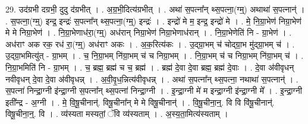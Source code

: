 \documentclass[17pt]{extarticle}
\begin{document}
29. उद॑ग्रभी दग्रभी॒ दुदु द॑ग्रभीत् । . अ॒ग्र॒भी॒दित्य॑ग्रभीत् । . अथा॑ स॒पत्ना᳚न् थ्स॒पत्ना॒(ग्म्॒) अथाथा॑ स॒पत्नान्॑ । . स॒पत्ना॒(ग्म्॒) इन्द्र॒ इन्द्रः॑ स॒पत्ना᳚न् थ्स॒पत्ना॒(ग्म्॒) इन्द्रः॑ । . इन्द्रो॑ मे म॒ इन्द्र॒ इन्द्रो॑ मे । . मे॒ नि॒ग्रा॒भेण॑ निग्रा॒भेण॑ मे मे निग्रा॒भेण॑ । . नि॒ग्रा॒भेणाध॑रा॒(ग्म्॒) अध॑रान् निग्रा॒भेण॑ निग्रा॒भेणाध॑रान् । . नि॒ग्रा॒भेणेति॑ नि - ग्रा॒भेण॑ । . अध॑राꣳ अक रक॒ रध॑ रा॒(ग्म्॒) अध॑राꣳ अकः । . अ॒क॒रित्य॑कः । . उ॒द्ग्रा॒भम् च॑ चोद्ग्रा॒भ मु॑द्ग्रा॒भम् च॑ । . उ॒द्ग्रा॒भमित्यु॑त् - ग्रा॒भम् । . च॒ नि॒ग्रा॒भम् नि॑ग्रा॒भम् च॑ च निग्रा॒भम् । . नि॒ग्रा॒भम् च॑ च निग्रा॒भम् नि॑ग्रा॒भम् च॑ । . नि॒ग्रा॒भमिति॑ नि - ग्रा॒भम् । . च॒ ब्रह्म॒ ब्रह्म॑ च च॒ ब्रह्म॑ । . ब्रह्म॑ दे॒वा दे॒वा ब्रह्म॒ ब्रह्म॑ दे॒वाः । . दे॒वा अ॑वीवृधन् नवीवृधन् दे॒वा दे॒वा अ॑वीवृधन्न् । . अ॒वी॒वृ॒ध॒न्नित्य॑वीवृधन्न् । . अथा॑ स॒पत्ना᳚न् थ्स॒पत्ना॒ नथाथा॑ स॒पत्नान्॑ । . स॒पत्ना॑ निन्द्रा॒ग्नी इ॑न्द्रा॒ग्नी स॒पत्ना᳚न् थ्स॒पत्ना॑ निन्द्रा॒ग्नी । . इ॒न्द्रा॒ग्नी मे॑ म इन्द्रा॒ग्नी इ॑न्द्रा॒ग्नी मे᳚ । . इ॒न्द्रा॒ग्नी इती᳚न्द्र - अ॒ग्नी । . मे॒ वि॒षू॒चीनान्॑. विषू॒चीना᳚न् मे मे विषू॒चीनान्॑ । . वि॒षू॒चीना॒न्॒. वि वि वि॑षू॒चीनान्॑. विषू॒चीना॒न्॒. वि । . व्य॑स्यता मस्यतां॒ ॅवि व्य॑स्यताम् । . अ॒स्य॒ता॒मित्य॑स्यताम् । \newline
\end{document}
